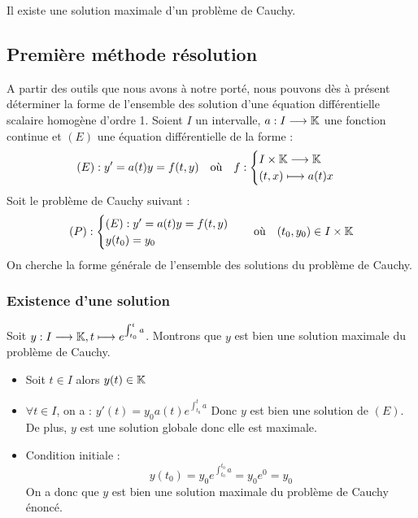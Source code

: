 \begin{theorem}
    Il existe une solution maximale d'un problème de Cauchy. 
\end{theorem}


\subsection{Première méthode résolution}

A partir des outils que nous avons à notre porté, nous pouvons dès à présent déterminer la forme de l'ensemble des solution 
d'une équation différentielle scalaire homogène d'ordre 1. Soient $I$ un intervalle, $a : I \longrightarrow \mathbb{K}$ une fonction continue 
et $(E)$ une équation différentielle de la forme : 
    \[ (E) : y' = a(t)y = f(t,y) \quad \text{où} \quad f : 
        \begin{cases}
            I \times \mathbb{K} \longrightarrow \mathbb{K} \\ 
            (t,x) \longmapsto a(t)x
        \end{cases}
    \]
Soit le problème de Cauchy suivant : 
    \[ (P) : 
        \begin{cases}
            (E) : y' = a(t)y = f(t,y) \\ 
            y(t_0) = y_0
        \end{cases}
        \quad \text{où} \quad (t_0,y_0) \in I \times \mathbb{K} \] 
On cherche la forme générale de l'ensemble des solutions du problème de Cauchy. 

\subsubsection{Existence d'une solution}

Soit $y : I \longrightarrow \mathbb{K}, t \longmapsto e^{ \int_{t_0}^{t} a}$. Montrons que $y$ est bien une solution maximale du 
problème de Cauchy. 
\begin{itemize}
    \item Soit $t \in I$ alors $y(t) \in \mathbb{K}$ 
    \item $ \forall t \in I$, on a : $y'(t) = y_0 a(t) e^{ \int_{t_0}^{t} a}$ 
    Donc $y$ est bien une solution de $(E)$. De plus, $y$ est une solution globale donc elle est maximale. 
    \item Condition initiale : 
        \[ y(t_0) = y_0 e^{ \int_{t_0}^{t_0} a} = y_0 e^0 = y_0 \] 
    On a donc que $y$ est bien une solution maximale du problème de Cauchy énoncé. 
\end{itemize}


